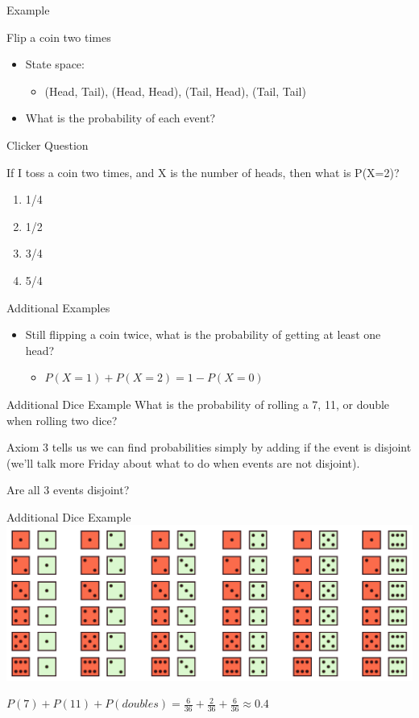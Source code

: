 \documentclass{beamer}
\begin{document}
\begin{frame}{Example}
	
	Flip a coin two times
	\begin{itemize}
		\item State space:
		      \begin{itemize}
		      	\item (Head, Tail), (Head, Head), (Tail, Head), (Tail, Tail)
		      \end{itemize}
		\item What is the probability of each event?
	\end{itemize}
	
\end{frame}

\begin{frame}{Clicker Question}
	
	If I toss a coin two times, and X is the number of heads, then what is P(X=2)?
	\begin{enumerate}[label=(\alph*)]
		\item 1/4
		\item 1/2
		\item 3/4
		\item 5/4
	\end{enumerate}
	
\end{frame}

\begin{frame}{Additional Examples}
	
	\begin{itemize}
		\item  Still flipping a coin twice, what is the probability of getting at least one head?
		      \begin{itemize}
		      	\item $P(X=1) + P(X=2) = 1-P(X=0)$
		      \end{itemize}
	\end{itemize}
	
\end{frame}

\begin{frame}{Additional Dice Example}
	What is the probability of rolling a 7, 11, or double when rolling two dice?
	
	Axiom 3 tells us we can find probabilities simply by adding if the event is disjoint (we'll talk more Friday about what to do when events are not disjoint).
	
	Are all 3 events disjoint?
\end{frame}

\begin{frame}{Additional Dice Example}
	\includegraphics[width=\textwidth]{twodiesamplespace}
	
	$P(7)+P(11)+P(doubles)=\frac{6}{36}+\frac{2}{36}+\frac{6}{36} \approx 0.4$
\end{frame}
\end{document}
